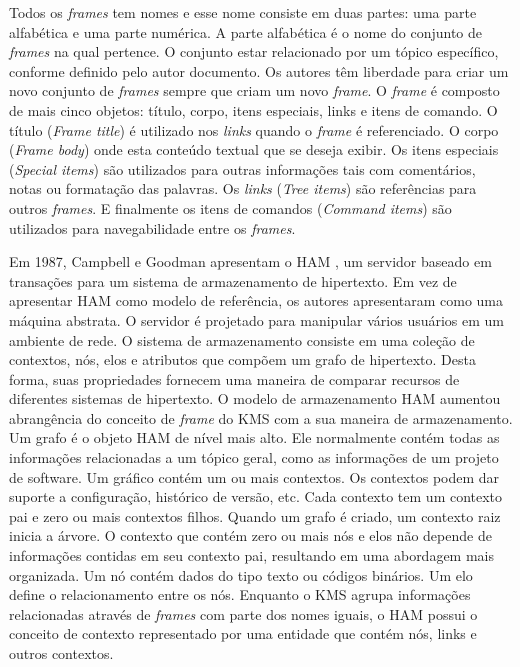 Todos os \textit{frames} tem nomes e esse nome consiste em duas partes: uma parte alfabética e uma parte numérica. A parte alfabética é o nome do conjunto de \textit{frames} na qual pertence. O conjunto estar relacionado por um tópico específico, conforme definido pelo autor documento. Os autores têm liberdade para criar um novo conjunto de \textit{frames} sempre que criam um novo \textit{frame}. O \textit{frame} é composto de mais cinco objetos: título, corpo, itens especiais, links e itens de comando. O título (\textit{Frame title}) é utilizado nos \textit{links} quando o \textit{frame} é referenciado. O corpo (\textit{Frame body}) onde esta conteúdo textual que se deseja exibir. Os itens especiais (\textit{Special items}) são utilizados para outras informações tais com comentários, notas ou formatação das palavras. Os \textit{links} (\textit{Tree items}) são referências para outros \textit{frames}. E finalmente os itens de comandos (\textit{Command items}) são utilizados para navegabilidade entre os \textit{frames}. 

Em 1987, Campbell e Goodman apresentam o HAM \cite{campbell1987ham}, um servidor baseado em transações para um sistema de armazenamento de hipertexto. Em vez de apresentar HAM como modelo de referência, os autores apresentaram como uma máquina abstrata. O servidor é projetado para manipular vários usuários em um ambiente de rede. O sistema de armazenamento consiste em uma coleção de contextos, nós, elos e atributos que compõem um grafo de hipertexto. Desta forma, suas propriedades fornecem uma maneira de comparar recursos de diferentes sistemas de hipertexto. O modelo de armazenamento HAM aumentou abrangência do conceito de \textit{frame} do KMS com a sua maneira de armazenamento. Um grafo é o objeto HAM de nível mais alto. Ele normalmente contém todas as informações relacionadas a um tópico geral, como as informações de um projeto de software. Um gráfico contém um ou mais contextos. Os contextos podem dar suporte a configuração, histórico de versão, etc. Cada contexto tem um contexto pai e zero ou mais contextos filhos. Quando um grafo é criado, um contexto raiz inicia a árvore. O contexto que contém zero ou mais nós e elos não depende de informações contidas em seu contexto pai, resultando em uma abordagem mais organizada. Um nó contém dados do tipo texto ou códigos binários. Um elo define o relacionamento entre os nós. Enquanto o KMS agrupa informações relacionadas através de \textit{frames} com parte dos nomes iguais, o HAM possui o conceito de contexto representado por uma entidade que contém nós, links e outros contextos. 

